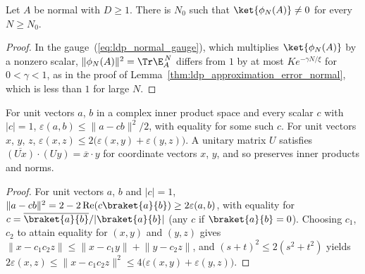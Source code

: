 \begin{lemma}
    \label{lem:ldp_periodic_state_nonzero}
    \leanok
    Let $A$ be normal with $D\ge1$. There is $N_0$ such that
    $\ket{\phi_N(A)}\neq0$ for every $N\ge N_0$.
\end{lemma}
\begin{proof}
    \leanok
    In the gauge~(\ref{eq:ldp_normal_gauge}), which multiplies $\ket{\phi_N(A)}$
    by a nonzero scalar, $\lVert\phi_N(A)\rVert^2=\Tr\E_A^{\,N}$ differs from $1$
    by at most $Ke^{-\gamma N/\xi}$ for $0<\gamma<1$, as in the proof of
    Lemma~\ref{thm:ldp_approximation_error_normal}, which is less than $1$ for
    large $N$.
\end{proof}

\begin{lemma}
    \label{lem:ldp_error_triangle}
    \leanok
    For unit vectors $a$, $b$ in a complex inner product space and every
    scalar $c$ with $\lvert c\rvert=1$,
    $\varepsilon(a,b)\le\lVert a-cb\rVert^2/2$, with equality for some such
    $c$. For unit vectors $x$, $y$, $z$,
    $\varepsilon(x,z)\le2\bigl(\varepsilon(x,y)+\varepsilon(y,z)\bigr)$.
    A unitary matrix $U$ satisfies
    $\overline{(Ux)}\cdot(Uy)=\overline{x}\cdot y$ for coordinate vectors
    $x$, $y$, and so preserves inner products and norms.
\end{lemma}
\begin{proof}
    \leanok
    For unit vectors $a$, $b$ and $\lvert c\rvert=1$,
    $\lVert a-cb\rVert^2=2-2\operatorname{Re}(c\braket{a}{b})
        \ge2\varepsilon(a,b)$, with equality for
    $c=\overline{\braket{a}{b}}/\lvert\braket{a}{b}\rvert$ (any $c$ if
    $\braket{a}{b}=0$). Choosing $c_1$, $c_2$ to attain equality for $(x,y)$ and
    $(y,z)$ gives
    $\lVert x-c_1c_2z\rVert\le\lVert x-c_1y\rVert+\lVert y-c_2z\rVert$, and
    $(s+t)^2\le2(s^2+t^2)$ yields
    $2\varepsilon(x,z)\le\lVert x-c_1c_2z\rVert^2
        \le4\bigl(\varepsilon(x,y)+\varepsilon(y,z)\bigr)$.
\end{proof}

